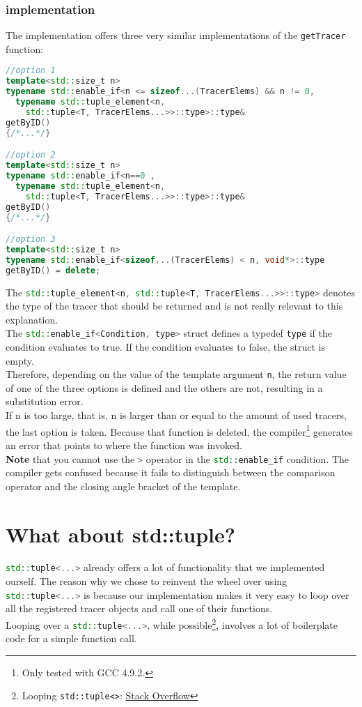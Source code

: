 \documentclass[12pt]{article}
\newcommand{\inlinecpp}[1]{\lstinline[language=c++]{#1}}
\begin{document}
\subsubsection{implementation}
The implementation offers three very similar implementations of the \inlinecpp{getTracer} function:
\begin{lstlisting}[language=c++]
//option 1
template<std::size_t n>
typename std::enable_if<n <= sizeof...(TracerElems) && n != 0,
  typename std::tuple_element<n,
    std::tuple<T, TracerElems...>>::type>::type&
getByID()
{/*...*/}

//option 2
template<std::size_t n>
typename std::enable_if<n==0 ,
  typename std::tuple_element<n,
    std::tuple<T, TracerElems...>>::type>::type&
getByID()
{/*...*/}

//option 3
template<std::size_t n>
typename std::enable_if<sizeof...(TracerElems) < n, void*>::type
getByID() = delete;
\end{lstlisting}
The \inlinecpp{std::tuple_element<n, std::tuple<T, TracerElems...>>::type>} denotes the type of the tracer that should be returned and is not really relevant to this explanation.\\
The \inlinecpp{std::enable_if<Condition, type>} struct defines a typedef \lstinline{type}\lstinline{} if the condition evaluates to true. If the condition evaluates to false, the struct is empty.\\
Therefore, depending on the value of the template argument \inlinecpp{n}, the return value of one of the three options is defined and the others are not, resulting in a substitution error.\\
If n is too large, that is, n is larger than or equal to the amount of used tracers, the last option is taken. Because that function is deleted, the compiler\footnote{Only tested with GCC 4.9.2.} generates an error that points to where the function was invoked.\\
\textbf{Note} that you cannot use the \inlinecpp{>} operator in the \inlinecpp{std::enable_if} condition. The compiler gets confused because it fails to distinguish between the comparison operator and the closing angle bracket of the template.

\section{What about std::tuple?}
\inlinecpp{std::tuple<...>} already offers a lot of functionality that we implemented ourself. The reason why we chose to reinvent the wheel over using \inlinecpp{std::tuple<...>} is because our implementation makes it very easy to loop over all the registered tracer objects and call one of their functions.\\
Looping over a \inlinecpp{std::tuple<...>}, while possible\footnote{Looping \lstinline{std::tuple<>}: \href{http://stackoverflow.com/a/6894436}{Stack Overflow}}, involves a lot of boilerplate code for a simple function call.
\end{document}
